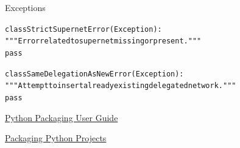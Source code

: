 \documentclass[11pt]{beamer}
\begin{document}
\begin{frame}[fragile]{Exceptions}
\begin{alltt}\scriptsize
class StrictSupernetError(Exception):
    """Error related to supernet missing or present."""
    pass

class SameDelegationAsNewError(Exception):
    """Attempt to insert already existing delegated network."""
    pass
\end{alltt}
\end{frame}

\begin{frame}[fragile]{\href{https://packaging.python.org/}{Python Packaging User Guide}}
  \hspace*{-.5cm}
\end{frame}

\begin{frame}[fragile]{\href{https://packaging.python.org/tutorials/packaging-projects/}{Packaging Python Projects}}
  \hspace*{-.5cm}
\end{frame}
\end{document}
